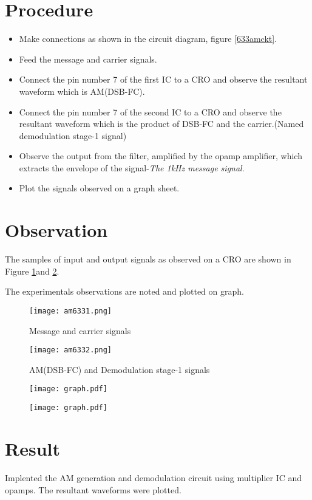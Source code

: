 \section*{Procedure}
\begin{itemize}
\item
Make connections as shown in the circuit diagram, figure \ref{633amckt}.
\item
Feed the message and carrier signals.
\item
Connect the pin number 7 of the first IC to a CRO and observe the resultant waveform which is AM(DSB-FC).
\item
Connect the pin number 7 of the second IC to a CRO and observe the resultant waveform which is the product of DSB-FC and the carrier.(Named demodulation stage-1 signal)
\item
Observe the output from the filter, amplified by the opamp amplifier, which extracts the envelope of the signal-\emph{The 1kHz message signal}.
\item
Plot the signals observed on a graph sheet.
\end{itemize}
\section*{Observation}
The samples of input and output signals as observed on a CRO are shown in Figure \ref{AM633plot1}and \ref{AM633plot2}.

The experimentals observations are noted and plotted on graph.
\begin{figure}[ht]
\texttt{[image: am6331.png]}
\caption{Message and carrier signals}
\label{AM633plot1}
\end{figure}

\begin{figure}[ht]
\texttt{[image: am6332.png]}
\caption{AM(DSB-FC) and Demodulation stage-1 signals}
\label{AM633plot2}
\end{figure}

\begin{figure}
	\texttt{[image: graph.pdf]}
\end{figure}

\begin{figure}
	\texttt{[image: graph.pdf]}
\end{figure}



\section*{Result}
Implented the AM generation and demodulation circuit using multiplier IC and opamps.
The resultant waveforms were plotted.